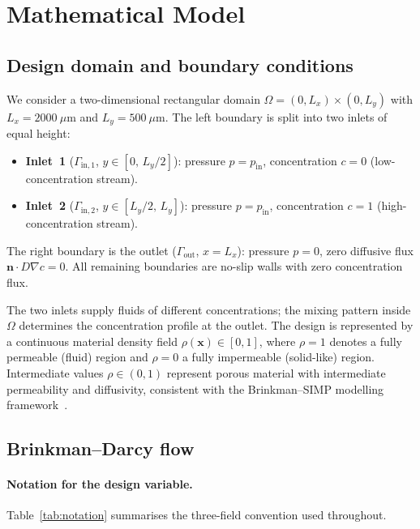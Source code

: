 \section{Mathematical Model}
\label{sec:model}

\subsection{Design domain and boundary conditions}
We consider a two-dimensional rectangular domain \(\Omega = (0,L_x) \times (0,L_y)\) with \(L_x = 2000\ \mu\text{m}\) and \(L_y = 500\ \mu\text{m}\).
The left boundary is split into two inlets of equal height:
\begin{itemize}
    \item \textbf{Inlet~1} (\(\Gamma_{\text{in},1}\), \(y\in[0,\,L_y/2]\)): pressure \(p = p_{\text{in}}\), concentration \(c = 0\) (low-concentration stream).
    \item \textbf{Inlet~2} (\(\Gamma_{\text{in},2}\), \(y\in[L_y/2,\,L_y]\)): pressure \(p = p_{\text{in}}\), concentration \(c = 1\) (high-concentration stream).
\end{itemize}
The right boundary is the outlet (\(\Gamma_{\text{out}}\), \(x = L_x\)): pressure \(p = 0\), zero diffusive flux \(\mathbf{n}\cdot D\nabla c = 0\).
All remaining boundaries are no-slip walls with zero concentration flux.

The two inlets supply fluids of different concentrations; the mixing pattern inside \(\Omega\) determines the concentration profile at the outlet.
The design is represented by a continuous material density field
\(\rho(\mathbf{x}) \in [0,1]\), where \(\rho=1\) denotes
a fully permeable (fluid) region and \(\rho=0\) a fully
impermeable (solid-like) region.
Intermediate values $\rho\in(0,1)$ represent porous material
with intermediate permeability and diffusivity, consistent with
the Brinkman--SIMP modelling framework~\cite{borrvall2003}.

\subsection{Brinkman--Darcy flow}
\label{sec:brinkman}

\paragraph{Notation for the design variable.}
Table~\ref{tab:notation} summarises the three-field convention
used throughout.

